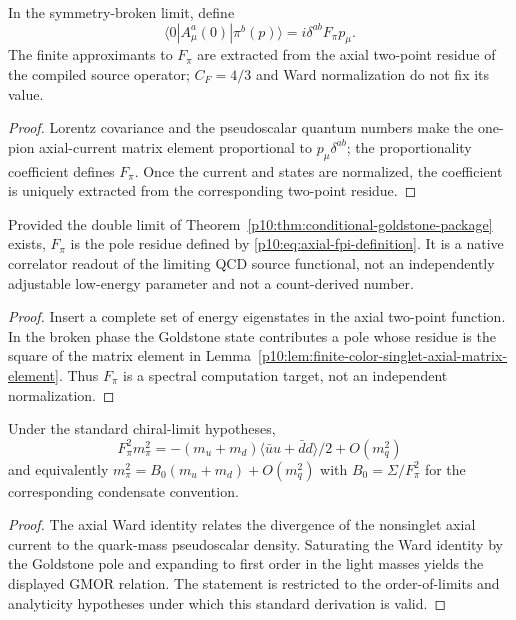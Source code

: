 \documentclass[12pt,a4paper]{article}
\begin{document}
\begin{lemma}
\label{p10:lem:finite-color-singlet-axial-matrix-element}
In the symmetry-broken limit, define
\begin{equation}
\label{p10:eq:axial-fpi-definition}
\langle0|A_\mu^a(0)|\pi^b(p)\rangle=i\delta^{ab}F_\pi p_\mu .
\end{equation}
The finite approximants to \(F_\pi\) are extracted from the axial two-point residue of the compiled source operator; \(C_F=4/3\) and Ward normalization do not fix its value.
\end{lemma}
\begin{proof}
Lorentz covariance and the pseudoscalar quantum numbers make the one-pion axial-current matrix element proportional to $p_\mu\delta^{ab}$; the proportionality coefficient defines $F_\pi$.  Once the current and states are normalized, the coefficient is uniquely extracted from the corresponding two-point residue.
\end{proof}

\begin{theorem}
\label{p10:thm:goldstone-tangent-axial-saturation}
Provided the double limit of Theorem~\ref{p10:thm:conditional-goldstone-package} exists, \(F_\pi\) is the pole residue defined by \eqref{p10:eq:axial-fpi-definition}.  It is a native correlator readout of the limiting QCD source functional, not an independently adjustable low-energy parameter and not a count-derived number.
\end{theorem}
\begin{proof}
Insert a complete set of energy eigenstates in the axial two-point function.  In the broken phase the Goldstone state contributes a pole whose residue is the square of the matrix element in Lemma~\ref{p10:lem:finite-color-singlet-axial-matrix-element}.  Thus $F_\pi$ is a spectral computation target, not an independent normalization.
\end{proof}

\begin{theorem}
\label{p10:thm:gmor-chiral-bridge}
Under the standard chiral-limit hypotheses,
\begin{equation}
F_\pi^2m_\pi^2=-(m_u+m_d)\langle\bar u u+\bar d d\rangle/2+O(m_q^2)
\end{equation}
and equivalently \(m_\pi^2=B_0(m_u+m_d)+O(m_q^2)\) with \(B_0=\Sigma/F_\pi^2\) for the corresponding condensate convention.
\end{theorem}
\begin{proof}
The axial Ward identity relates the divergence of the nonsinglet axial current to the quark-mass pseudoscalar density.  Saturating the Ward identity by the Goldstone pole and expanding to first order in the light masses yields the displayed GMOR relation.  The statement is restricted to the order-of-limits and analyticity hypotheses under which this standard derivation is valid.
\end{proof}
\end{document}
